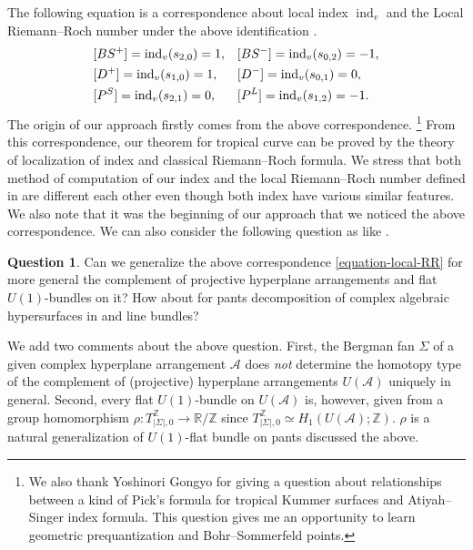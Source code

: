 \documentclass[a4paper,dvipdfmx,reqno,12pt]{amsart}
\theoremstyle{definition}
\newtheorem{question}[theorem]{Question}
\newcommand{\opn}[1]{\operatorname{#1}}
\newcommand{\myfootnote}[1]{\hspace{-5pt}\footnote{#1}}
\numberwithin{equation}{section}
\begin{document}
The following equation is a correspondence about 
local index $\opn{ind}_v$ and the Local 
Riemann--Roch number under the above 
identification \cite[Theorem 6.7]{MR2676658}.
\begin{align} \label{equation-local-RR}
& [BS^{+}]=\opn{ind}_v(s_{2,0})=1, 
&& [BS^{-}]=\opn{ind}_v(s_{0,2})=-1,\notag \\
& [D^{+}]=\opn{ind}_v(s_{1,0})=1,
&& [D^{-}]=\opn{ind}_v(s_{0,1})=0, \\
& [P^{S}]=\opn{ind}_v(s_{2,1})=0,
&& [P^{L}]=\opn{ind}_v(s_{1,2})=-1 \notag.
\end{align}
The origin of our approach firstly comes from the 
above correspondence.
\myfootnote{
We also thank Yoshinori Gongyo for 
giving a question about relationships 
between a kind of Pick's formula for
tropical Kummer surfaces and Atiyah--Singer
index formula. This question gives me 
an opportunity to learn geometric prequantization and
Bohr--Sommerfeld points.
}
From this correspondence, 
our theorem for tropical curve can be 
proved by the theory of localization of index 
and classical Riemann--Roch formula.
We stress that both method of computation
of our index and the local Riemann--Roch number
defined in \cite{MR2676658} are different 
each other even though both index have various 
similar features.
We also note that it was the beginning of our 
approach that we 
noticed the above correspondence.
We can also consider the following question as 
like \cite{auroux2022lagrangian}.

\begin{question}
Can we generalize the 
above correspondence \ref{equation-local-RR}
for more general the complement of
projective hyperplane arrangements and flat $U(1)$-bundles on it?
How about for pants decomposition of
  complex algebraic hypersurfaces in \cite{MR2079993} and line bundles?
\end{question}

We add two comments about the above question. 
First, the Bergman fan $\Sigma$ of a given complex 
hyperplane arrangement $\mathcal{A}$ does \emph{not} 
determine 
the homotopy type of the complement of (projective) 
hyperplane
arrangements $U(\mathcal{A})$ uniquely in general.
Second, every flat $U(1)$-bundle on 
$U(\mathcal{A})$ is, 
however, given
from a group homomorphism 
$\rho\colon T_{|\Sigma|,0}^{\mathbb{Z}}\to 
\mathbb{R}/\mathbb{Z}$ since 
$T_{|\Sigma|,0}^{\mathbb{Z}}\simeq 
H_1(U(\mathcal{A});\mathbb{Z})$.
$\rho$ is a natural generalization of $U(1)$-flat 
bundle on pants discussed the above.
\end{document}
